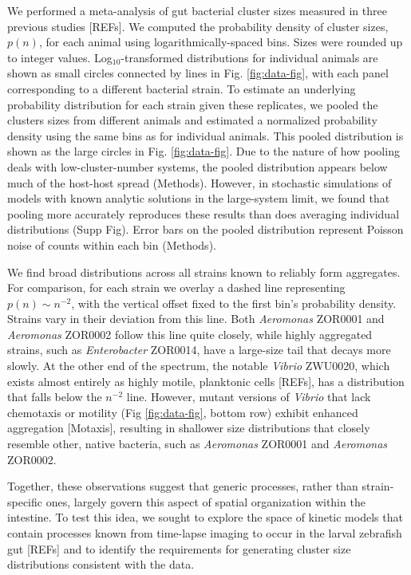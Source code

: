 \documentclass[aps,pre,twocolumn]{revtex4-1}
\begin{document}
We performed a meta-analysis of gut bacterial cluster sizes measured in three previous studies [REFs]. We computed the probability density of cluster sizes, $p(n)$, for each animal using logarithmically-spaced bins. Sizes were rounded up to integer values. Log$_{10}$-transformed distributions for individual animals are shown as small circles connected by lines in Fig. \ref{fig:data-fig}, with each panel corresponding to a different bacterial strain. To estimate an underlying probability distribution for each strain given these replicates, we pooled the clusters sizes from different animals and estimated a normalized probability density using the same bins as for individual animals. This pooled distribution is shown as the large circles in Fig. \ref{fig:data-fig}. Due to the nature of how pooling deals with low-cluster-number systems, the pooled distribution appears below much of the host-host spread (Methods). However, in stochastic simulations of models with known analytic solutions in the large-system limit, we found that pooling more accurately reproduces these results than does averaging individual distributions (Supp Fig). Error bars on the pooled distribution represent Poisson noise of counts within each bin (Methods). 





We find broad distributions across all strains known to reliably form aggregates. For comparison, for each strain we overlay a dashed line representing $p(n) \sim n^{-2}$, with the vertical offset fixed to the first bin’s probability density. Strains vary in their deviation from this line. Both \textit{Aeromonas} ZOR0001 and \textit{Aeromonas} ZOR0002 follow this line quite closely, while highly aggregated strains, such as \textit{Enterobacter} ZOR0014, have a large-size tail that decays more slowly. At the other end of the spectrum, the notable \textit{Vibrio} ZWU0020, which exists almost entirely as highly motile, planktonic cells [REFs], has a distribution that falls below the $n^{-2}$ line. However, mutant versions of \textit{Vibrio} that lack chemotaxis or motility (Fig \ref{fig:data-fig}, bottom row) exhibit enhanced aggregation [Motaxis], resulting in shallower size distributions that closely resemble other, native bacteria, such as \textit{Aeromonas} ZOR0001 and \textit{Aeromonas} ZOR0002.  


Together, these observations suggest that generic processes, rather than strain-specific ones, largely govern this aspect of spatial organization within the intestine. To test this idea, we sought to explore the space of kinetic models that contain processes known from time-lapse imaging to occur in the larval zebrafish gut [REFs] and to identify the requirements for generating cluster size distributions consistent with the data. 
\end{document}
